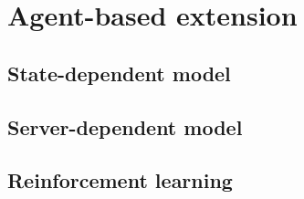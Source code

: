 \chapter{Agent-based extension}
\section{State-dependent model}
\section{Server-dependent model}
\section{Reinforcement learning}
